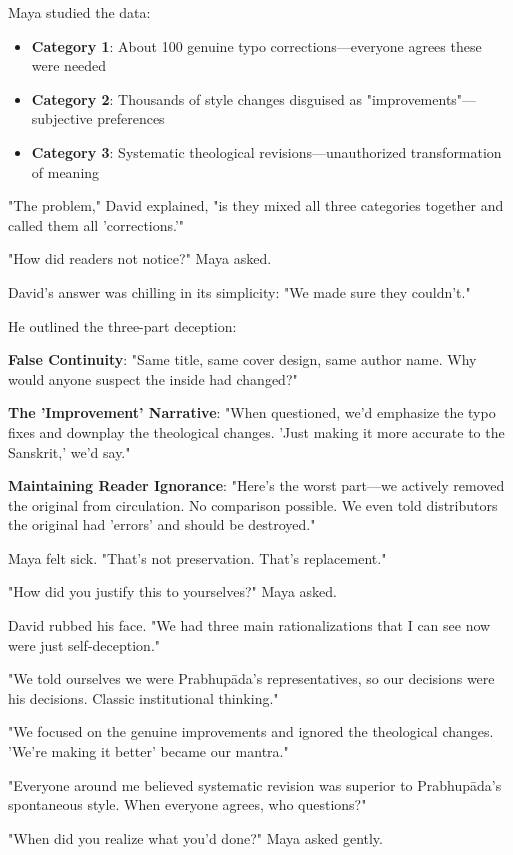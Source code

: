 \documentclass[12pt,twoside]{book}
\begin{document}
Maya studied the data:
\begin{itemize}
\item \textbf{\textbf{Category 1}}: About 100 genuine typo corrections—everyone agrees these were needed
\item \textbf{\textbf{Category 2}}: Thousands of style changes disguised as "improvements"—subjective preferences
\item \textbf{\textbf{Category 3}}: Systematic theological revisions—unauthorized transformation of meaning
\end{itemize}

"The problem," David explained, "is they mixed all three categories together and called them all 'corrections.'"

"How did readers not notice?" Maya asked.

David's answer was chilling in its simplicity: "We made sure they couldn't."

He outlined the three-part deception:

\textbf{\textbf{False Continuity}}: "Same title, same cover design, same author name. Why would anyone suspect the inside had changed?"

\textbf{\textbf{The 'Improvement' Narrative}}: "When questioned, we'd emphasize the typo fixes and downplay the theological changes. 'Just making it more accurate to the Sanskrit,' we'd say."

\textbf{\textbf{Maintaining Reader Ignorance}}: "Here's the worst part—we actively removed the original from circulation. No comparison possible. We even told distributors the original had 'errors' and should be destroyed."

Maya felt sick. "That's not preservation. That's replacement."

"How did you justify this to yourselves?" Maya asked.

David rubbed his face. "We had three main rationalizations that I can see now were just self-deception."

"We told ourselves we were Prabhupāda's representatives, so our decisions were his decisions. Classic institutional thinking."

"We focused on the genuine improvements and ignored the theological changes. 'We're making it better' became our mantra."

"Everyone around me believed systematic revision was superior to Prabhupāda's spontaneous style. When everyone agrees, who questions?"

"When did you realize what you'd done?" Maya asked gently.
\end{document}
